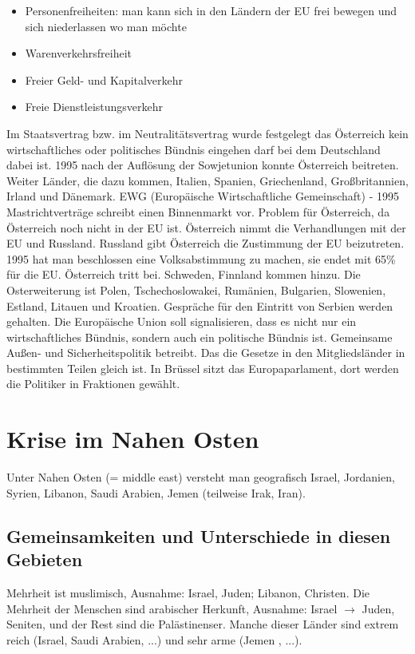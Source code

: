 \documentclass[a4paper,final]{report}
\begin{document}
\begin{itemize}
\item Personenfreiheiten: man kann sich in den Ländern der EU frei bewegen und sich niederlassen wo man möchte
\item Warenverkehrsfreiheit
\item Freier Geld- und Kapitalverkehr
\item Freie Dienstleistungsverkehr
\end{itemize}

Im Staatsvertrag bzw. im Neutralitätsvertrag wurde festgelegt das Österreich kein wirtschaftliches oder politisches Bündnis  eingehen darf bei dem Deutschland dabei ist. 1995 nach der Auflösung der Sowjetunion konnte Österreich beitreten. Weiter Länder, die dazu kommen, Italien, Spanien, Griechenland, Großbritannien, Irland und Dänemark.
\newline
\newline
EWG (Europäische Wirtschaftliche Gemeinschaft) - 1995 Mastrichtverträge schreibt einen Binnenmarkt vor. Problem für Österreich, da Österreich noch nicht in der EU ist. Österreich nimmt die Verhandlungen  mit der EU und Russland. Russland gibt Österreich die Zustimmung der EU beizutreten. 1995 hat man beschlossen eine Volksabstimmung zu machen, sie endet mit 65\% für die EU. Österreich tritt bei.
\newline
\newline
Schweden, Finnland kommen hinzu. Die Osterweiterung ist Polen, Tschechoslowakei, Rumänien, Bulgarien, Slowenien, Estland, Litauen und Kroatien. Gespräche für den Eintritt von Serbien werden gehalten. 
\newline
\newline
Die Europäische Union soll signalisieren, dass es nicht nur ein wirtschaftliches Bündnis, sondern auch ein politische Bündnis ist. Gemeinsame Außen- und Sicherheitspolitik betreibt. Das die Gesetze in den Mitgliedsländer in bestimmten Teilen gleich ist.
\newline
\newline
In Brüssel sitzt das Europaparlament, dort werden die Politiker in Fraktionen gewählt.

\section{Krise im Nahen Osten}

Unter Nahen Osten (= middle east) versteht man geografisch Israel, Jordanien, Syrien, Libanon, Saudi Arabien, Jemen (teilweise Irak, Iran).

\subsection{Gemeinsamkeiten und Unterschiede in diesen Gebieten}

Mehrheit ist muslimisch, Ausnahme: Israel, Juden; Libanon, Christen. Die Mehrheit der Menschen sind arabischer Herkunft, Ausnahme: Israel $\rightarrow$ Juden, Seniten, und der Rest sind die Palästinenser. Manche dieser Länder sind extrem reich (Israel, Saudi Arabien, ...) und sehr arme (Jemen , ...).
\end{document}
